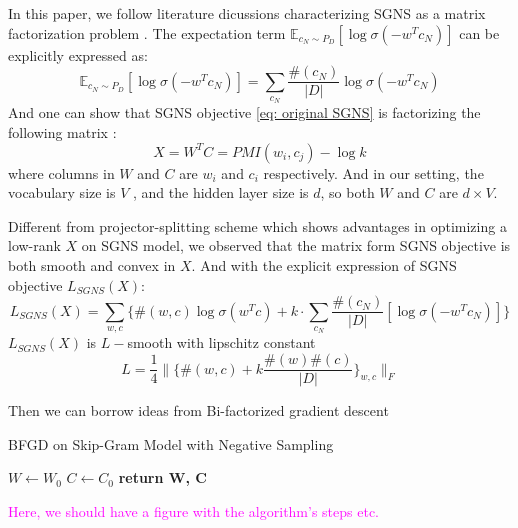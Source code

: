 \documentclass[letterpaper]{article} %
\begin{document}
In this paper, we follow literature dicussions characterizing SGNS as a matrix factorization problem \cite{levy2014neural}\cite{levy2015improving}. The expectation term $\mathbb{E}_{c_N\sim P_D}[\log \sigma(-w^Tc_N)]$ can be explicitly expressed as:
\begin{equation}
	\mathbb{E}_{c_N\sim P_D}[\log \sigma(-w^Tc_N)]=\sum_{c_N}\frac{\#(c_N)}{|D|}\log{\sigma(-w^Tc_N)}
\end{equation}
And one can show that SGNS objective \ref{eq: original SGNS} is factorizing the following matrix \cite{levy2014neural}:
\begin{equation}
	X=W^TC= PMI(w_i, c_j)-\log k \label{eq: SPPMI}
\end{equation}
where columns in $W$ and $C$ are $w_i$ and $c_i$ respectively. And in our setting, the vocabulary size is $V$ , and the hidden layer size is $d$, so both $W$ and $C$ are $d\times V$.

Different from projector-splitting scheme\cite{fonarev2017riemannian} which shows advantages in optimizing a low-rank $X$ on SGNS model, we observed that the matrix form SGNS objective is both smooth and convex in $X$. And with the explicit expression of SGNS objective $L_{SGNS}(X)$:
\begin{equation}
	L_{SGNS}(X)=\sum_{w,c}\{\#(w,c)\log\sigma(w^Tc)+k\cdot\sum_{c_N}\frac{\#(c_N)}{|D|}[\log \sigma(-w^Tc_N)]\}
\end{equation}
$L_{SGNS}(X)$ is $L-$smooth with lipschitz constant $$L=\frac{1}{4}\|\{\#(w,c)+k\frac{\#(w)\#(c)}{|D|}\}_{w,c}\|_F$$



Then we can borrow ideas from Bi-factorized gradient descent  \cite{park2016finding}

\begin{algorithm}
\caption{BFGD on Skip-Gram Model with Negative Sampling}\label{alg:bfgd}
\begin{algorithmic}[1]
 
\State $W\gets W_0$
\State $C\gets C_0$
\EndFor
\State \textbf{return W, C}
\EndProcedure
\end{algorithmic}
\end{algorithm}

\textcolor{magenta}{Here, we should have a figure with the algorithm's steps etc.}
\end{document}
